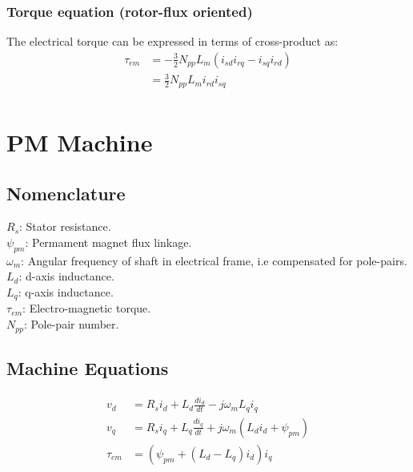 \documentclass[]{book}
\begin{document}
\hypertarget{torque-equation-rotor-flux-oriented}{%
\subsection{Torque equation (rotor-flux oriented)}\label{torque-equation-rotor-flux-oriented}}

The electrical torque can be expressed in terms of cross-product as:
\[
\begin{aligned}
\tau_{em} &= - \frac{3}{2}N_{pp}L_m(i_{sd}i_{rq} -  i_{sq}i_{rd}) \\
&=  \frac{3}{2}N_{pp}L_m i_{rd}  i_{sq} \\
\end{aligned}
\label{eq:rotorFluxTorque1}
\]

\hypertarget{pm-machine}{%
\chapter{PM Machine}\label{pm-machine}}

\hypertarget{nomenclature-2}{%
\section{Nomenclature}\label{nomenclature-2}}

\(R_s\): Stator resistance.\\
\(\psi_{pm}\): Permament magnet flux linkage.\\
\(\omega_m\): Angular frequency of shaft in electrical frame, i.e compensated for pole-pairs.\\
\(L_d\): d-axis inductance.\\
\(L_q\): q-axis inductance.\\
\(\tau_{em}\): Electro-magnetic torque.\\
\(N_{pp}\): Pole-pair number.

\hypertarget{machine-equations}{%
\section{Machine Equations}\label{machine-equations}}

\[
\begin{aligned}
v_d & = R_s i_d + L_d\frac{di_d}{dt} - j \omega_m L_q i_q  \\
v_q & = R_s i_q + L_q\frac{di_q}{dt} + j \omega_m (L_d i_d + \psi_{pm})  \\
\tau_{em} & =  (\psi_{pm} + (L_d-L_q) i_d)i_q  \\
\end{aligned}
\label{eq:pmsmMdl1}
\]
\end{document}
